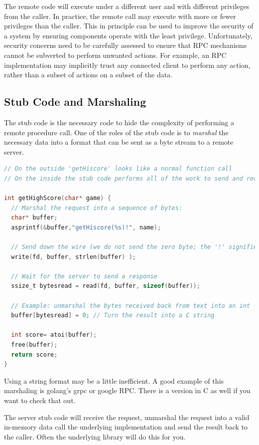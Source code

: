 The remote code will execute under a different user and with different privileges from the caller.
In practice, the remote call may execute with more or fewer privileges than the caller.
This in principle can be used to improve the security of a system by ensuring components operate with the least privilege.
Unfortunately, security concerns need to be carefully assessed to ensure that RPC mechanisms cannot be subverted to perform unwanted actions.
For example, an RPC implementation may implicitly trust any connected client to perform any action, rather than a subset of actions on a subset of the data.

\subsection{Stub Code and Marshaling}

The stub code is the necessary code to hide the complexity of performing a remote procedure call.
One of the roles of the stub code is to \emph{marshal} the necessary data into a format that can be sent as a byte stream to a remote server.

\begin{lstlisting}[language=C]
// On the outside 'getHiscore' looks like a normal function call
// On the inside the stub code performs all of the work to send and receive data to and from the remote machine.

int getHighScore(char* game) {
  // Marshal the request into a sequence of bytes:
  char* buffer;
  asprintf(&buffer,"getHiscore(%s)!", name);

  // Send down the wire (we do not send the zero byte; the '!' signifies the end of the message)
  write(fd, buffer, strlen(buffer) );

  // Wait for the server to send a response
  ssize_t bytesread = read(fd, buffer, sizeof(buffer));

  // Example: unmarshal the bytes received back from text into an int
  buffer[bytesread] = 0; // Turn the result into a C string

  int score= atoi(buffer);
  free(buffer);
  return score;
}
\end{lstlisting}

Using a string format may be a little inefficient.
A good example of this marshaling is golang's grpc or google RPC. There is a version in C as well if you want to check that out.

The server stub code will receive the request, unmarshal the request into a valid in-memory data call the underlying implementation and send the result back to the caller.
Often the underlying library will do this for you.

